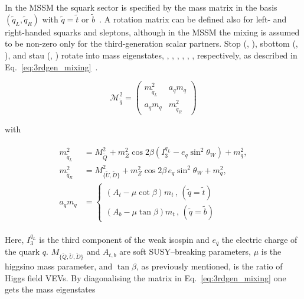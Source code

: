 				In the \ac{MSSM} the squark sector is specified by the mass matrix in the basis $(\tilde{q}_L, \tilde{q}_R)$ with $\tilde{q} = \tilde{t}$ or $\tilde{b}$~\cite{Haber:1984rc}. A rotation matrix can be defined also for left- and right-handed squarks and sleptons, although in the \ac{MSSM} the mixing is assumed to be non-zero only for the third-generation scalar partners. Stop (\stopL, \stopR), sbottom (\sbottomL, \sbottomR), and stau (\stauL, \stauR) rotate into mass eigenstates, \stopone, \stoptwo, \sbottomone, \sbottomtwo, \stauone, \stautwo, respectively, as described in Eq.~\ref{eq:3rdgen_mixing}~\cite{Hidaka:2000cm}. %

				\begin{equation}
				\label{eq:3rdgen_mixing}
					\mathcal {M}_{\tilde{q}}^2 = 
					\begin{pmatrix}
						m_{\tilde{q}_L}^2 & a_q m_q \\
						a_q m_q & m_{\tilde{q}_R}^2
					\end{pmatrix}
				\end{equation}

				\noindent with 

				\begin{align}
				\label{eq:msqL}
					\begin{split}
						m_{\tilde{q}_L}^2 & = M_{\tilde{Q}}^2 + m_Z^2 \cos 2\beta \left ( I_3^{q_L} - e_q \sin^2 \theta_W \right ) + m_q^2 ,
						\\ 
						m_{\tilde{q}_R}^2 & = M_{{\{ \tilde{U},\tilde{D} \}}}^2 + m_Z^2 \cos 2\beta\, e_q \sin^2 \theta_W  + m_q^2 , 
						\\
						a_q m_q & = 
						\begin{cases}
							\left ( A_t - \mu \cot \beta \right ) m_t\, , \, (\tilde{q} = \tilde{t}) \\  
							\left ( A_b - \mu \tan \beta \right ) m_t\, , \, (\tilde{q} = \tilde{b})  
						\end{cases}
					\end{split}
				\end{align}

				\noindent Here, $I_3^{q_L}$ is the third component of the weak isospin and $e_q$ the electric charge of the quark $q$. $M_{{\{ \tilde{Q},\tilde{U},\tilde{D} \}}}$ and $A_{t,b}$ are soft \ac{SUSY}–breaking parameters, $\mu$ is the higgsino mass parameter, and $\tan \beta$, as previously mentioned, is the ratio of Higgs field \ac{VEV}s. By diagonalising the matrix in Eq.~\ref{eq:3rdgen_mixing} one gets the mass eigenstates 
				
